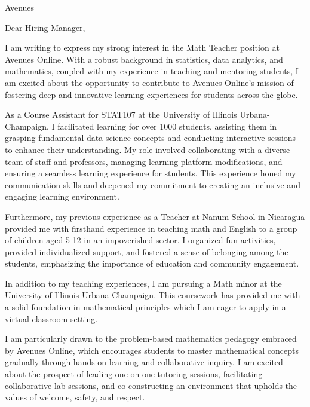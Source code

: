 \documentclass{letter}
\begin{document}
\begin{letter}{Avenues\\
}


\opening{Dear Hiring Manager,}


I am writing to express my strong interest in the Math Teacher 
position at Avenues Online. With a robust background in statistics, 
data analytics, and mathematics, coupled with my experience in teaching 
and mentoring students, I am excited about the opportunity to contribute 
to Avenues Online's mission of fostering deep and innovative 
learning experiences for students across the globe.

As a Course Assistant for STAT107 at the University of Illinois 
Urbana-Champaign, I facilitated learning for over 1000 students, 
assisting them in grasping fundamental data science concepts 
and conducting interactive sessions to enhance their understanding.
 My role involved collaborating with a diverse team of staff and professors, 
 managing learning platform modifications, and ensuring a seamless 
 learning experience for students. This experience honed my 
 communication skills and deepened my commitment to creating 
 an inclusive and engaging learning environment.

Furthermore, my previous experience as a Teacher at Nanum School in 
Nicaragua provided me with firsthand experience in teaching math
 and English to a group of children aged 5-12 in an impoverished sector. 
 I organized fun activities, provided individualized support, 
 and fostered a sense of belonging among the students, emphasizing 
 the importance of education and community engagement.

In addition to my teaching experiences, I am pursuing a Math minor 
at the University of Illinois Urbana-Champaign. This coursework has 
provided me with a solid foundation in mathematical principles which I 
am eager to apply in a virtual classroom setting.

I am particularly drawn to the problem-based mathematics 
pedagogy embraced by Avenues Online, which encourages 
students to master mathematical concepts gradually through 
hands-on learning and collaborative inquiry. I am excited 
about the prospect of leading one-on-one tutoring sessions, 
facilitating collaborative lab sessions, and co-constructing 
an environment that upholds the values of welcome, safety, and respect.


\end{letter}
\end{document}
